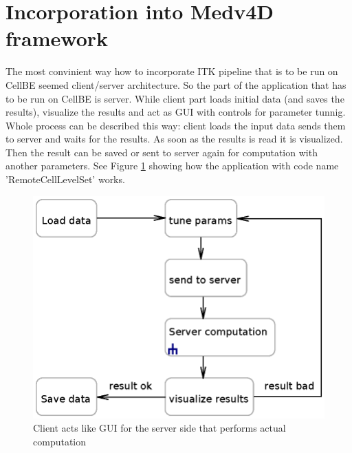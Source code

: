 \section{Incorporation into Medv4D framework}

\par
The most convinient way how to incorporate ITK pipeline that is to be run on CellBE seemed client/server architecture. So the part of the application that has to be run on CellBE is server. While client part loads initial data (and saves the results), visualize the results and act as GUI with controls for parameter tunnig. Whole process can be described this way: client loads the input data sends them to server and waits for the results. As soon as the results is read it is visualized. Then the result can be saved or sent to server again for computation with another parameters. See Figure \ref{fg:computationProcess} showing how the application with code name 'RemoteCellLevelSet' works.

\begin{figure}
    \centering
    \includegraphics[width=14cm]{data/computationProcess.eps}
    \caption[RemoteCellLevelSet application computation process]{Client acts like GUI for the server side that performs actual computation}
    \label{fg:computationProcess}
\end{figure}

